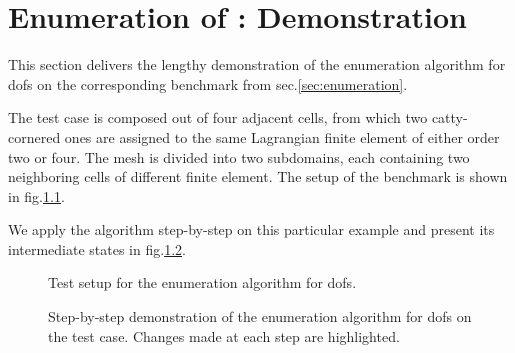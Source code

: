 \chapter{Enumeration of : Demonstration}
\label{app::enumeration}

This section delivers the lengthy demonstration of the enumeration algorithm for \glspl{dof} on the corresponding benchmark from sec.\@ \ref{sec:enumeration}.

The test case is composed out of four adjacent cells, from which two catty-cornered ones are assigned to the same Lagrangian finite element of either order two or four. The mesh is divided into two subdomains, each containing two neighboring cells of different finite element. The setup of the benchmark is shown in fig.\@ \ref{fig:enumdemosetup}.

We apply the algorithm step-by-step on this particular example and present its intermediate states in fig.\@ \ref{fig:enumdemosteps}.

\begin{figure}
  \centering
  \caption{Test setup for the enumeration algorithm for \glspl{dof}.}
  \label{fig:enumdemosetup}
\end{figure}

\begin{figure}
  \centering
  \caption{Step-by-step demonstration of the enumeration algorithm for \glspl{dof} on the test case. Changes made at each step are highlighted.}
  \label{fig:enumdemosteps}
\end{figure}